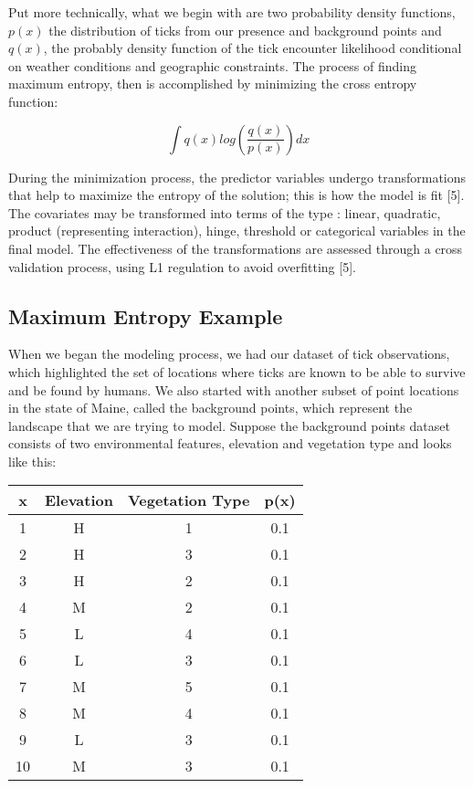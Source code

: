 \noindent Put more technically, what we begin with are two probability density functions, $p(x)$ the distribution of ticks from our presence and background points and $q(x)$, the probably density function of the tick encounter likelihood conditional on weather conditions and geographic constraints. The process of finding maximum entropy, then is  accomplished by minimizing the cross entropy function:  \newline

\begin{equation}
\int q(x)log(\frac{q(x)}{p(x)}) dx
\end{equation}


\noindent  During the minimization process, the predictor variables undergo transformations that help to maximize the entropy of the solution; this is how the model is fit [5]. The covariates may be transformed into terms of the type : linear, quadratic, product (representing interaction), hinge, threshold or categorical variables in the final model. The effectiveness of the transformations are assessed through a cross validation process, using L1 regulation to avoid overfitting [5].  \newline


\subsection{Maximum Entropy Example}

\noindent When we began the modeling process, we had our dataset of tick observations, which highlighted the set of locations where ticks are known to be able to survive and be found by humans. We also started with another subset of point locations in the state of Maine, called the background points, which represent the landscape that we are trying to model. Suppose the background points dataset consists of two environmental features, elevation and vegetation type and looks like this: 

\begin{center}
 \begin{tabular}{||c c c c||} 
 \hline
 x & Elevation & Vegetation Type & p(x) \\ [0.5ex] 
 \hline\hline
 1 & H &  1& 0.1  \\ 
 \hline
  2 & H & 3 & 0.1\\
 \hline
   3 & H & 2 & 0.1\\
 \hline
 4 & M & 2 & 0.1  \\
 \hline
  5 & L & 4 & 0.1 \\
 \hline
   6 & L & 3 & 0.1\\
 \hline
  7 & M & 5 & 0.1 \\
 \hline
   8 & M & 4 & 0.1\\
 \hline
 9 & L & 3 & 0.1 \\
 \hline
   10 & M & 3 & 0.1\\
 \hline
\end{tabular}
\end{center}


